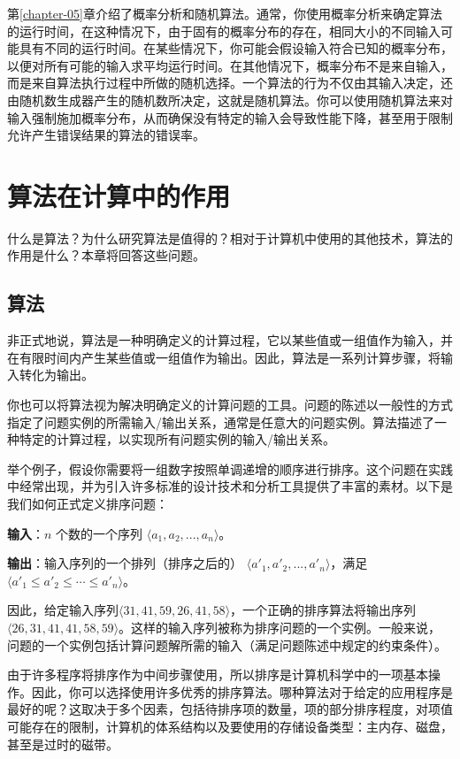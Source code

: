 \documentclass[lang=cn,newtx,10pt,scheme=chinese]{elegantbook}
\begin{document}
第\ref{chapter-05}章介绍了概率分析和随机算法。通常，你使用概率分析来确定算法的运行时间，在这种情况下，由于固有的概率分布的存在，相同大小的不同输入可能具有不同的运行时间。在某些情况下，你可能会假设输入符合已知的概率分布，以便对所有可能的输入求平均运行时间。在其他情况下，概率分布不是来自输入，而是来自算法执行过程中所做的随机选择。一个算法的行为不仅由其输入决定，还由随机数生成器产生的随机数所决定，这就是随机算法。你可以使用随机算法来对输入强制施加概率分布，从而确保没有特定的输入会导致性能下降，甚至用于限制允许产生错误结果的算法的错误率。

\chapter{算法在计算中的作用}\label{chapter-01}

什么是算法？为什么研究算法是值得的？相对于计算机中使用的其他技术，算法的作用是什么？本章将回答这些问题。

\section{算法}\label{section-1.1}

非正式地说，算法是一种明确定义的计算过程，它以某些值或一组值作为输入，并在有限时间内产生某些值或一组值作为输出。因此，算法是一系列计算步骤，将输入转化为输出。

你也可以将算法视为解决明确定义的计算问题的工具。问题的陈述以一般性的方式指定了问题实例的所需输入/输出关系，通常是任意大的问题实例。算法描述了一种特定的计算过程，以实现所有问题实例的输入/输出关系。

举个例子，假设你需要将一组数字按照单调递增的顺序进行排序。这个问题在实践中经常出现，并为引入许多标准的设计技术和分析工具提供了丰富的素材。以下是我们如何正式定义排序问题：

\textbf{输入}：$n$ 个数的一个序列 $\langle a_1, a_2, ..., a_n\rangle$。

\textbf{输出}：输入序列的一个排列（排序之后的） $\langle{a'_1,a'_2,...,a'_n}\rangle$，满足$\langle{a'_1\le a'_2\le \cdots\le a'_n}\rangle$。

因此，给定输入序列$\langle{31,41,59,26,41,58}\rangle$，一个正确的排序算法将输出序列 $\langle{26,31,41,41,58,59}\rangle$。这样的输入序列被称为排序问题的一个实例。一般来说，问题的一个实例包括计算问题解所需的输入（满足问题陈述中规定的约束条件）。

由于许多程序将排序作为中间步骤使用，所以排序是计算机科学中的一项基本操作。因此，你可以选择使用许多优秀的排序算法。哪种算法对于给定的应用程序是最好的呢？这取决于多个因素，包括待排序项的数量，项的部分排序程度，对项值可能存在的限制，计算机的体系结构以及要使用的存储设备类型：主内存、磁盘，甚至是过时的磁带。
\end{document}
